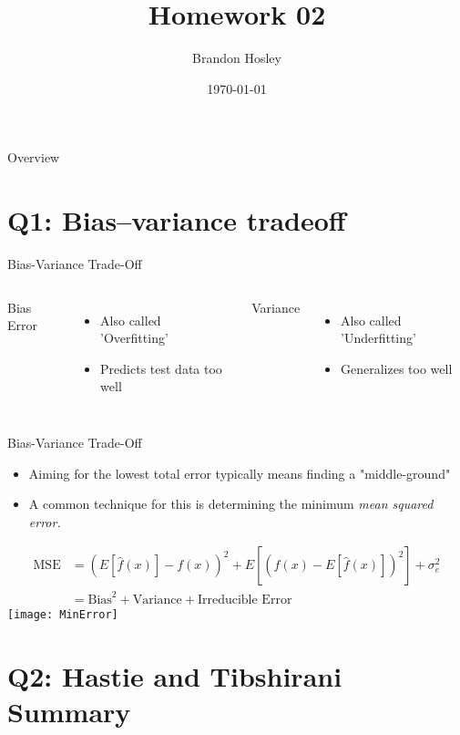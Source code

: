 \documentclass{beamer}
\title{Homework 02}
\author{Brandon Hosley}
\institute{University of Illinois - Springfield}
\date{\today}
\begin{document}
\frame{\titlepage}

\begin{frame}{Overview}
\tableofcontents
\end{frame}

\section[Q1]{Q1: Bias–variance tradeoff}

\begin{frame}{Bias-Variance Trade-Off}
	\begin{columns}
		Bias Error
		\begin{itemize}
			\item<1-> Also called 'Overfitting'
			\item<4-> Predicts test data too well
		\end{itemize}
		
		Variance 
		\begin{itemize}
			\item<2-> Also called 'Underfitting'
			\item<5-> Generalizes too well
		\end{itemize}
	\end{columns}
	\centering
\end{frame}

\begin{frame}{Bias-Variance Trade-Off}
	\begin{itemize}%
		\item Aiming for the lowest total error typically means finding a "middle-ground"
		\item A common technique for this is determining the minimum \emph{mean squared error.} 
	\end{itemize}
	\begin{align*}
		\text{MSE} &= \left( E\left[\hat{f}(x)\right]-f(x)\right)^2 + E\left[\left(\hat{f}(x) - E\left[\hat{f}(x)\right]\right)^2\right] +
		\sigma^2_e \\
		&= \text{Bias}^2 + \text{Variance} + \text{Irreducible Error}
	\end{align*}
	\centering
	\texttt{[image: MinError]}
\end{frame}

\section[Q2]{Q2: Hastie and Tibshirani Summary}
\end{document}
